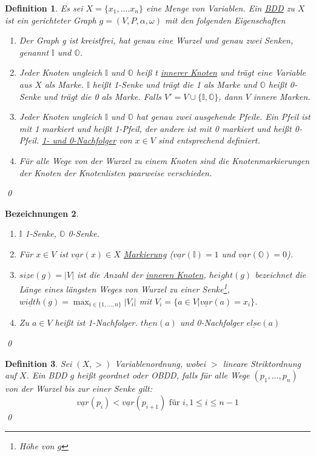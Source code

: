 \documentclass[ngerman]{scrartcl}
\theoremstyle{custom}
\newtheorem{mdef}{Definition} \numberwithin{mdef}{subsection}
\newtheorem{mbez}[mdef]{Bezeichnungen}
\newcommand{\0}{\mathbf{0}}
\newcommand{\1}{\mathbf{L}}
\begin{document}
\begin{mdef}
Es sei $X = \{x_1, \dots. x_n\}$ eine Menge von Variablen. Ein
\underline{BDD} zu $X$ ist ein gerichteter Graph $g =
(V,P,\alpha,\omega)$ mit den folgenden Eigenschaften
\begin{enumerate}
\item[(1)] Der Graph g ist kreistfrei, hat genau eine Wurzel und genau
  zwei Senken, genannt $\mathds{I}$ und $\mathds{O}$.
\item[(2)] Jeder Knoten ungleich $\mathds{I}$ und $\mathds{O}$ hei\ss
  t \underline{innerer Knoten} und tr\"agt eine Variable aus $X$ als
  Marke. $\mathds{I}$ hei\ss t 1-Senke und tr\"agt die 1 als Marke und
  $\mathds{O}$ hei\ss t 0-Senke und tr\"agt die 0 als Marke. Falls $V'
  = V \cup \{\mathds{I}, \mathds{O}\}$, dann $V$ innere Marken.
\item[(3)] Jeder Knoten ungleich 
$\mathds{I}$ und $\mathds{O}$ hat
  genau zwei ausgehende Pfeile. Ein Pfeil ist mit 1 markiert und
  hei\ss t 1-Pfeil, der andere ist mit 0 markiert und hei\ss t
  0-Pfeil. \underline{1- und 0-Nachfolger} von $x \in V$ sind entsprechend definiert.
\item[(4)] F\"ur alle Wege von der Wurzel zu einem Knoten sind die
  Knotenmarkierungen der Knoten der Knotenlisten paarweise
  verschieden.
\end{enumerate}
\qed
\end{mdef}

\begin{mbez}
\begin{enumerate}
\item[(1)] $\mathds{I}$ 1-Senke, $\mathds{O}$ 0-Senke.
\item[(2)] F\"ur $x \in V$ ist $\underline{var}(x) \in X$
  \underline{Markierung} ($\underline{var}(\mathds{I})=1$ und
  $\underline{var}(\mathds{O})=0$).
\item[(3)] $\underline{size}(g)=\vert V \vert$ ist die Anzahl der
  \underline{inneren Knoten}, $\underline{height}(g)$ bezeichnet die
  L\"ange eines l\"angsten Weges von Wurzel zu einer
  Senke\footnote{H\"ohe von $g$}, $\underline{width}(g)= \max_{i \in
    \{1,\dots,n\}} \vert V_i \vert$ mit $V_i = \{ a \in V \vert
  \underline{var}(a)=x_i\}$.
\item[(4)]  Zu $a \in V$ hei\ss t ist 1-Nachfolger.
  $\underline{then}(a)$ und 0-Nachfolger $\underline{else}(a)$
\end{enumerate}
\qed
\end{mbez}

\begin{mdef}
Sei $(X,>)$ Variablenordnung, wobei $>$ lineare Striktordnung auf
$X$. Ein BDD $g$ hei\ss t geordnet oder OBDD, falls f\"ur alle Wege $(p_1,\dots,p_n)$ 
von der Wurzel bis zur einer Senke gilt:
\begin{equation*}
\underline{var}(p_i) < \underline{var}(p_{i+1}) \text{ f\"ur } i, 1
\leq i \leq n-1
\end{equation*}
\qed
\end{mdef}
\end{document}
